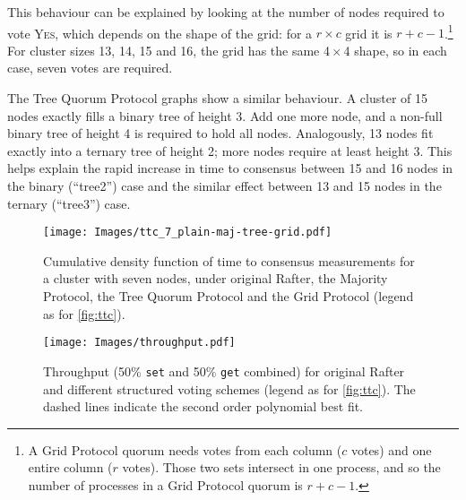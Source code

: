 \documentclass[12pt,chapterprefix=true,toc=bibliography,numbers=noendperiod,
               footnotes=multiple,twoside]{scrreprt}
\newcommand{\yes}{{\fontfamily{jkposn}\selectfont\textsc{Yes}}}
\begin{document}
This behaviour can be explained by looking at the number of nodes required to vote \yes, which depends on the shape of the grid: for a \(r \times c\) grid it is \(r + c - 1\).\footnote{A Grid Protocol quorum needs votes from each column  (\(c\) votes) and one entire column (\(r\) votes). Those two sets intersect in one process, and so the number of processes in a Grid Protocol quorum is \(r + c - 1\).} For cluster sizes 13, 14, 15 and 16, the grid has the same 4\,\(\times\)\,4 shape, so in each case, seven votes are required.


The Tree Quorum Protocol graphs show a similar behaviour. A cluster of 15 nodes exactly fills a binary tree of height 3. Add one more node, and a non-full binary tree of height 4 is required to hold all nodes. Analogously, 13 nodes fit exactly into a ternary tree of height 2; more nodes require at least height 3. This helps explain the rapid increase in time to consensus between 15 and 16 nodes in the binary (\enquote{tree2}) case and the similar effect between 13 and 15 nodes in the ternary (\enquote{tree3}) case.



\begin{figure}[p]
    \centering
    \texttt{[image: Images/ttc\_7\_plain-maj-tree-grid.pdf]}
    \caption{Cumulative density function of time to consensus measurements for a cluster with seven nodes, under original Rafter, the Majority Protocol, the Tree Quorum Protocol and the Grid Protocol (legend as for \cref{fig:ttc}).}
    \label{fig:plain-maj-tree-grid-ttc}
\end{figure}

\begin{figure}[p]
    \centering
    \texttt{[image: Images/throughput.pdf]}
    \caption{Throughput (50\% \texttt{set} and 50\% \texttt{get} combined) for original Rafter and different structured voting schemes (legend as for \cref{fig:ttc}). The dashed lines indicate the second order polynomial best fit.}
    \label{fig:throughput}
\end{figure}
\end{document}
